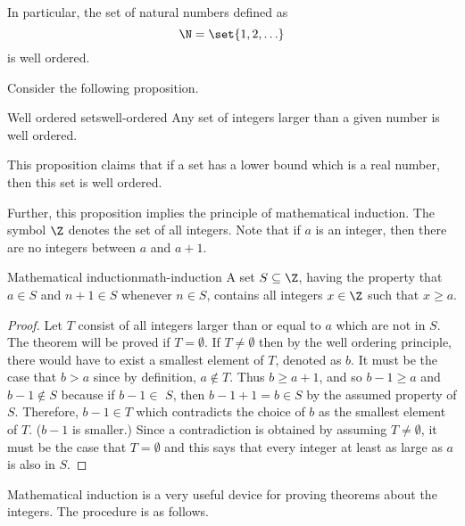 In particular, the set of natural numbers defined as
\begin{equation*}
\N = \set{1,2,\ldots}
\end{equation*}
is well ordered.

Consider the following proposition.

\begin{proposition}{Well ordered sets}{well-ordered}
Any set of integers larger than a given number is well ordered.
\end{proposition}

This proposition claims that if a set has a lower bound which is a real number,
then this set is well ordered.

Further, this proposition implies the principle of mathematical induction. The symbol $\Z$ denotes the set of all
integers. Note that if $a$ is an integer, then there are no integers between
$a$ and $a+1$.

\begin{theorem}{Mathematical induction}{math-induction}
 A set $S\subseteq \Z$, having
the property that $a\in S$ and $n+1\in S$ whenever $n\in S$, contains all
integers $x\in \Z$ such that $x\geq a$.
\end{theorem}

\begin{proof}
Let $T$ consist of all integers larger than or equal to $a$
which are not in $S$. The theorem will be proved if $T=\emptyset$. If
$T\neq \emptyset $ then by the well ordering principle, there would have to
exist a smallest element of $T$, denoted as $b$. It must be the case that
$b>a$ since by definition, $a\notin T$. Thus $b\geq a+1$, and so $b-1\geq a$
and $b-1\notin S$ because if $b-1\in $ $S$, then $b-1+1=b\in S$ by the
assumed property of $S$. Therefore, $b-1\in T$ which contradicts the choice
of $b$ as the smallest element of $T$. ($b-1$ is smaller.) Since a
contradiction is obtained by assuming $T\neq \emptyset$, it must be the
case that $T=\emptyset $ and this says that every integer at least as large
as $a$ is also in $S$.
\end{proof}

Mathematical induction is a very useful device for proving theorems about
the integers. The procedure is as follows.

